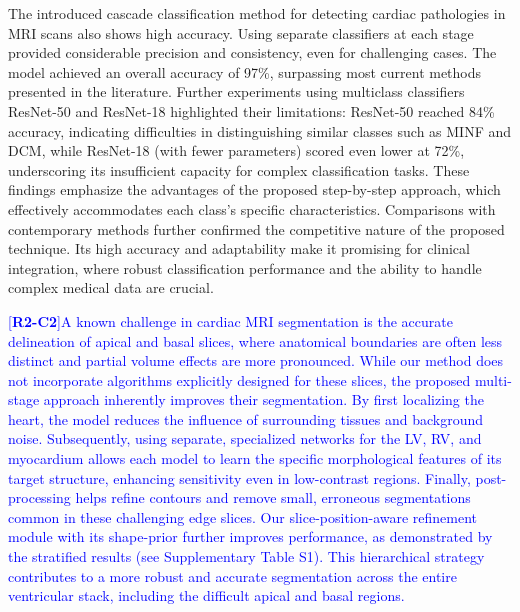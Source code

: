 \documentclass[fleqn,10pt]{wlscirep}
\newcommand{\revtag}[2]{[\textbf{R#1-C#2}]}
\newcommand{\Rtwo}[1]{\textcolor{blue}{#1}}
\begin{document}
The introduced cascade classification method for detecting cardiac pathologies in MRI scans also shows high accuracy. Using separate classifiers at each stage provided considerable precision and consistency, even for challenging cases. The model achieved an overall accuracy of 97\%, surpassing most current methods presented in the literature. Further experiments using multiclass classifiers ResNet-50 and ResNet-18 highlighted their limitations: ResNet-50 reached 84\% accuracy, indicating difficulties in distinguishing similar classes such as MINF and DCM, while ResNet-18 (with fewer parameters) scored even lower at 72\%, underscoring its insufficient capacity for complex classification tasks. These findings emphasize the advantages of the proposed step-by-step approach, which effectively accommodates each class’s specific characteristics. Comparisons with contemporary methods further confirmed the competitive nature of the proposed technique. Its high accuracy and adaptability make it promising for clinical integration, where robust classification performance and the ability to handle complex medical data are crucial.

\Rtwo{\revtag{2}{2}A known challenge in cardiac MRI segmentation is the accurate delineation of apical and basal slices, where anatomical boundaries are often less distinct and partial volume effects are more pronounced. While our method does not incorporate algorithms explicitly designed for these slices, the proposed multi-stage approach inherently improves their segmentation. By first localizing the heart, the model reduces the influence of surrounding tissues and background noise. Subsequently, using separate, specialized networks for the LV, RV, and myocardium allows each model to learn the specific morphological features of its target structure, enhancing sensitivity even in low-contrast regions. Finally, post-processing helps refine contours and remove small, erroneous segmentations common in these challenging edge slices. Our slice-position-aware refinement module with its shape-prior further improves performance, as demonstrated by the stratified results (see Supplementary Table S1). This hierarchical strategy contributes to a more robust and accurate segmentation across the entire ventricular stack, including the difficult apical and basal regions.}
\end{document}
